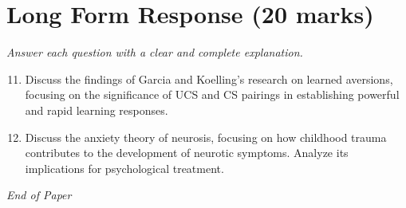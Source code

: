\documentclass[12pt]{article}
\begin{document}
\section*{Long Form Response (20 marks)}
\textit{Answer each question with a clear and complete explanation.}
\begin{enumerate}[label=\arabic*.]
\setcounter{enumi}{10}
\item Discuss the findings of Garcia and Koelling's research on learned aversions, focusing on the significance of UCS and CS pairings in establishing powerful and rapid learning responses.
\item Discuss the anxiety theory of neurosis, focusing on how childhood trauma contributes to the development of neurotic symptoms. Analyze its implications for psychological treatment.
\end{enumerate}

\vfill
\noindent\textit{End of Paper}
\end{document}

